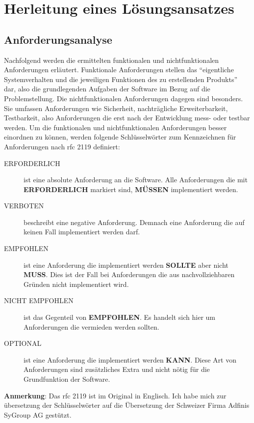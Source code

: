 \documentclass[titlepage]{report}
\begin{document}
\chapter*{Herleitung eines Lösungsansatzes}
\section*{Anforderungsanalyse}
Nachfolgend werden die ermittelten funktionalen und nichtfunktionalen
Anforderungen erläutert. Funktionale Anforderungen stellen das
``eigentliche Systemverhalten und die jeweiligen Funktionen des zu
erstellenden Produkts''\cite[S. 20]{BPSE} dar, also die grundlegenden
Aufgaben der Software im Bezug auf die Problemstellung. Die
nichtfunktionalen Anforderungen dagegen sind besonders. Sie umfassen
Anforderungen wie Sicherheit, nachträgliche Erweiterbarkeit,
Testbarkeit, also Anforderungen die erst nach der Entwicklung
mess\hyp{} oder testbar werden\cite[S. 292]{SNFA}. Um die funktionalen
und nichtfunktionalen Anforderungen besser einordnen zu können, werden
folgende Schlüsselwörter zum Kennzeichnen für Anforderungen nach
\gls{rfc} 2119\cite{RFC2119} definiert:
\begin{description}
    \item[ERFORDERLICH] ist eine absolute Anforderung an die Software. Alle
        Anforderungen die mit \textbf{ERFORDERLICH} markiert sind,
        \textbf{MÜSSEN} implementiert werden.
    \item[VERBOTEN] beschreibt eine negative Anforderung. Demnach eine
        Anforderung die auf keinen Fall implementiert werden darf.
    \item[EMPFOHLEN] ist eine Anforderung die implementiert werden
        \textbf{SOLLTE} aber nicht \textbf{MUSS}. Dies ist der Fall bei
        Anforderungen die aus nachvollziehbaren Gründen nicht
        implementiert wird.
    \item[NICHT EMPFOHLEN] ist das Gegenteil von \textbf{EMPFOHLEN}. Es
        handelt sich hier um Anforderungen die vermieden werden sollten.
    \item[OPTIONAL] ist eine Anforderung die implementiert werden
        \textbf{KANN}. Diese Art von Anforderungen sind
        zusätzliches Extra und nicht nötig für die Grundfunktion der
        Software.
\end{description}
\textbf{Anmerkung}: Das \gls{rfc} 2119 ist im Original in Englisch. Ich
habe mich zur übersetzung der Schlüsselwörter auf die Übersetzung der
Schweizer Firma Adfinis SyGroup AG gestützt\cite{RFC2119DE}.
\end{document}

